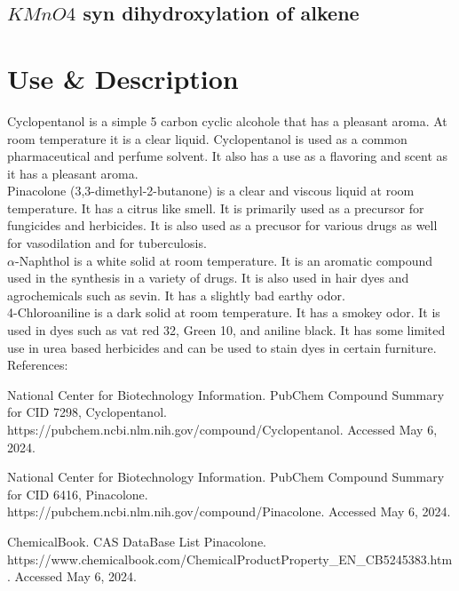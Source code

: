 \documentclass{article}
\begin{document}
	\subsection{$KMnO4$ syn dihydroxylation of alkene}
	
	\pagebreak
	\section{Use \& Description}
	Cyclopentanol is a simple 5 carbon cyclic alcohole  that has a pleasant aroma. At room temperature it is a clear liquid. Cyclopentanol is used as a common pharmaceutical and perfume solvent. It also has a use as a flavoring and scent as it has a pleasant aroma. \\
	
	Pinacolone (3,3-dimethyl-2-butanone) is a clear and viscous liquid at room temperature. It has a citrus like smell. It is primarily used as a precursor for fungicides and herbicides. It is also used as a precusor for various drugs as well for vasodilation and for tuberculosis. \\
	
	$\alpha$-Naphthol is a white solid at room temperature. It is an aromatic compound used in the synthesis in a variety of drugs. It is also used in hair dyes and agrochemicals such as sevin. It has a slightly bad earthy odor.\\
	
	4-Chloroaniline is a dark solid at room temperature. It has a smokey odor. It is used in dyes such as vat red 32, Green 10, and aniline black. It has some limited use in urea based herbicides and can be used to stain dyes in certain furniture.\\
	
	\small
	References: 
	
	National Center for Biotechnology Information. PubChem Compound Summary for CID 7298, Cyclopentanol.\\ https://pubchem.ncbi.nlm.nih.gov/compound/Cyclopentanol. Accessed May 6, 2024.
	

	National Center for Biotechnology Information. PubChem Compound Summary for CID 6416, Pinacolone.\\ https://pubchem.ncbi.nlm.nih.gov/compound/Pinacolone. Accessed May 6, 2024.
	
	ChemicalBook. CAS DataBase List Pinacolone.\\ https://www.chemicalbook.com/ChemicalProductProperty\_EN\_CB5245383.htm. Accessed May 6, 2024.
	
\end{document}

